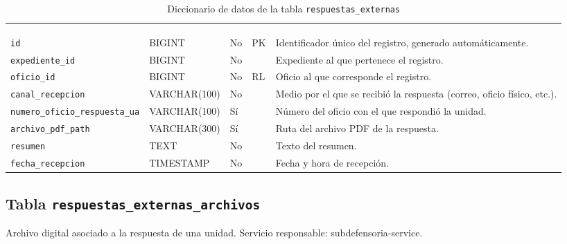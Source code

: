 \footnotesize
\renewcommand{\arraystretch}{1.15}
\setlength{\tabcolsep}{4pt}
\begin{longtable}{|L{3.9cm}|L{2.4cm}|L{0.9cm}|L{1.2cm}|L{6.6cm}|}
	\hiderowcolors\caption{Diccionario de datos de la tabla \texttt{respuestas\_externas}}
	\label{tab:dic_respuestas_externas} \\ \showrowcolors
	\hline
	 &  &  &  &  \\
	\hline
	\endfirsthead
	\hline
	 &  &  &  &  \\
	\hline
	\endhead
		\texttt{id} & BIGINT & No & PK & Identificador único del registro, generado automáticamente. \\ \hline
		\texttt{expediente\_\allowbreak{}id} & BIGINT & No &  & Expediente al que pertenece el registro. \\ \hline
		\texttt{oficio\_\allowbreak{}id} & BIGINT & No & RL & Oficio al que corresponde el registro. \\ \hline
		\texttt{canal\_\allowbreak{}recepcion} & VARCHAR(100) & No &  & Medio por el que se recibió la respuesta (correo, oficio físico, etc.). \\ \hline
		\texttt{numero\_\allowbreak{}oficio\_\allowbreak{}respuesta\_\allowbreak{}ua} & VARCHAR(100) & Sí &  & Número del oficio con el que respondió la unidad. \\ \hline
		\texttt{archivo\_\allowbreak{}pdf\_\allowbreak{}path} & VARCHAR(300) & Sí &  & Ruta del archivo PDF de la respuesta. \\ \hline
		\texttt{resumen} & TEXT & No &  & Texto del resumen. \\ \hline
		\texttt{fecha\_\allowbreak{}recepcion} & TIMESTAMP & No &  & Fecha y hora de recepción. \\ \hline
\end{longtable}
\normalsize
\setlength{\tabcolsep}{6pt}
\renewcommand{\arraystretch}{1}

\subsection{Tabla \texttt{respuestas\_externas\_archivos}}
Archivo digital asociado a la respuesta de una unidad. Servicio responsable: subdefensoria-service.


